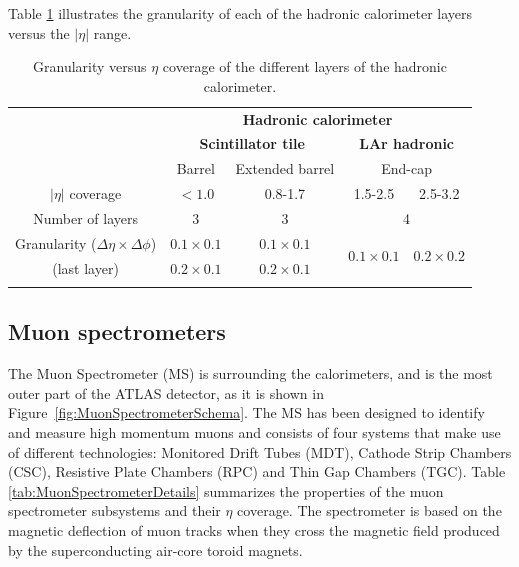 Table \ref{tab:TileGranularity} illustrates the granularity of each of the hadronic calorimeter layers versus the $|\eta|$ range.

\begin{table}[!ht]
  \begin{center}
    \begin{small}
      \setlength{\tabcolsep}{0.0pc}
      \begin{tabular*}{\textwidth}{@{\extracolsep{\fill}}ccccc}
        \noalign{\smallskip}\hline\hline\noalign{\smallskip}
                                     & \multicolumn{4}{c}{\textbf{Hadronic calorimeter}} \\
                                     & \multicolumn{2}{c}{\textbf{Scintillator tile}} & \multicolumn{2}{c}{\textbf{LAr hadronic}} \\
                                     & Barrel & Extended barrel & \multicolumn{2}{c}{End-cap} \\
        \noalign{\smallskip}\hline\noalign{\smallskip}
        $|\eta|$ coverage                            & $<1.0$         & 0.8-1.7        & 1.5-2.5        & 2.5-3.2 \\
         Number of layers                            & 3              & 3              & \multicolumn{2}{c}{4}       \\
        Granularity ($\Delta\eta \times \Delta\phi$) & $0.1\times0.1$ & $0.1\times0.1$ & \multirow{2}{*}{$0.1\times0.1$} & \multirow{2}{*}{$0.2\times0.2$} \\
        (last layer)                                 & $0.2\times0.1$ & $0.2\times0.1$ &                & \\ 
        \noalign{\smallskip}\hline\hline\noalign{\smallskip}
      \end{tabular*}
    \end{small}
  \end{center}
  \caption{Granularity versus $\eta$ coverage of the different layers of the hadronic calorimeter.}
  \label{tab:TileGranularity}
\end{table}


\subsection{Muon spectrometers}
    \label{subsec:MuonSpectrometers}

The Muon Spectrometer (MS) is surrounding the calorimeters, and is the most outer part of the ATLAS detector, as it is shown in Figure~\ref{fig:MuonSpectrometerSchema}. 
The MS has been designed to identify and measure high momentum muons and consists of four systems that make use of different technologies: Monitored Drift Tubes (MDT), Cathode Strip Chambers (CSC), Resistive Plate Chambers (RPC) and Thin Gap Chambers (TGC).
Table \ref{tab:MuonSpectrometerDetails} summarizes the properties of the muon spectrometer subsystems and their $\eta$ coverage.
The spectrometer is based on the magnetic deflection of muon tracks when they cross the magnetic field produced by the superconducting air-core toroid magnets.

